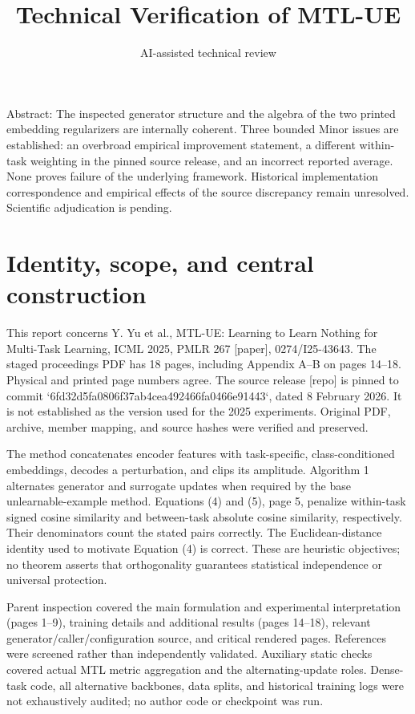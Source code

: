 \documentclass[10pt]{article}
\title{Technical Verification of MTL-UE}
\author{AI-assisted technical review}
\date{}
\begin{document}
\maketitle
Abstract: The inspected generator structure and the algebra of the two printed embedding regularizers are internally coherent. Three bounded Minor issues are established: an overbroad empirical improvement statement, a different within-task weighting in the pinned source release, and an incorrect reported average. None proves failure of the underlying framework. Historical implementation correspondence and empirical effects of the source discrepancy remain unresolved. Scientific adjudication is pending.\par
\section*{Identity, scope, and central construction}
This report concerns Y. Yu et al., MTL-UE: Learning to Learn Nothing for Multi-Task Learning, ICML 2025, PMLR 267 [paper], 0274/I25-43643. The staged proceedings PDF has 18 pages, including Appendix A–B on pages 14–18. Physical and printed page numbers agree. The source release [repo] is pinned to commit `6fd32d5fa0806f37ab4cea492466fa0466e91443`, dated 8 February 2026. It is not established as the version used for the 2025 experiments. Original PDF, archive, member mapping, and source hashes were verified and preserved.\par
The method concatenates encoder features with task-specific, class-conditioned embeddings, decodes a perturbation, and clips its amplitude. Algorithm 1 alternates generator and surrogate updates when required by the base unlearnable-example method. Equations (4) and (5), page 5, penalize within-task signed cosine similarity and between-task absolute cosine similarity, respectively. Their denominators count the stated pairs correctly. The Euclidean-distance identity used to motivate Equation (4) is correct. These are heuristic objectives; no theorem asserts that orthogonality guarantees statistical independence or universal protection.\par
Parent inspection covered the main formulation and experimental interpretation (pages 1–9), training details and additional results (pages 14–18), relevant generator/caller/configuration source, and critical rendered pages. References were screened rather than independently validated. Auxiliary static checks covered actual MTL metric aggregation and the alternating-update roles. Dense-task code, all alternative backbones, data splits, and historical training logs were not exhaustively audited; no author code or checkpoint was run.\par
\end{document}
